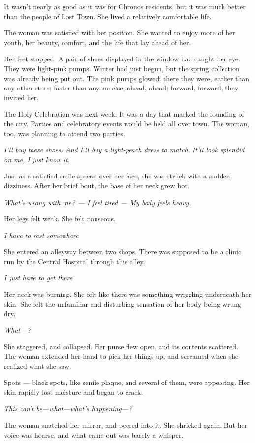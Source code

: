 It wasn't nearly as good as it was for Chronos residents, but it was
much better than the people of Lost Town. She lived a relatively
comfortable life.

The woman was satisfied with her position. She wanted to enjoy more of
her youth, her beauty, comfort, and the life that lay ahead of her.

Her feet stopped. A pair of shoes displayed in the window had caught her
eye. They were light-pink pumps. Winter had just begun, but the spring
collection was already being put out. The pink pumps glowed: there they
were, earlier than any other store; faster than anyone else; ahead,
ahead; forward, forward, they invited her.

The Holy Celebration was next week. It was a day that marked the
founding of the city. Parties and celebratory events would be held all
over town. The woman, too, was planning to attend two parties.

\emph{I'll buy these shoes. And I'll buy a light-peach dress to match. It'll
look splendid on me, I just know it.}

Just as a satisfied smile spread over her face, she was struck with a
sudden dizziness. After her brief bout, the base of her neck grew hot.

\emph{What's wrong with me? --- I feel tired --- My body feels heavy.}

Her legs felt weak. She felt nauseous.

\emph{I have to rest somewhere\el }

She entered an alleyway between two shops. There was supposed to be a
clinic run by the Central Hospital through this alley.

\emph{I just have to get there\el }

Her neck was burning. She felt like there was something wriggling
underneath her skin. She felt the unfamiliar and disturbing sensation of
her body being wrung dry.

\emph{What---?}

She staggered, and collapsed. Her purse flew open, and its contents
scattered. The woman extended her hand to pick her things up, and
screamed when she realized what she saw.

Spots --- black spots, like senile plaque, and several of them, were
appearing. Her skin rapidly lost moisture and began to crack.

\emph{This can't be---what---what's happening---?}

The woman snatched her mirror, and peered into it. She shrieked again.
But her voice was hoarse, and what came out was barely a whisper.

